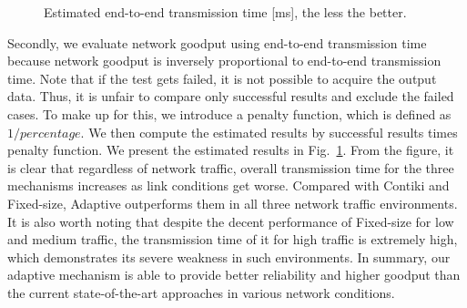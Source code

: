 \documentclass[runningheads,a4paper]{llncs}
\begin{document}
\begin{figure}
	\vspace{-10pt}
	\centering
	\caption{Estimated end-to-end transmission time [ms], the less the better.}
	\label{fig:tm}
	\vspace{-10pt}
\end{figure}
Secondly, we evaluate network goodput using end-to-end transmission time because network goodput is inversely proportional to end-to-end transmission time. Note that if the test gets failed, it is not possible to acquire the output data. Thus, it is unfair to compare only successful results and exclude the failed cases. To make up for this, we introduce a penalty function, which is defined as $1/percentage$. We then compute the estimated results by successful results times penalty function. We present the estimated results in Fig.~\ref{fig:tm}. From the figure, it is clear that regardless of network traffic, overall transmission time for the three mechanisms increases as link conditions get worse. Compared with Contiki and Fixed-size, Adaptive outperforms them in all three network traffic environments. It is also worth noting that despite the decent performance of Fixed-size for low and medium traffic, the transmission time of it for high traffic is extremely high, which demonstrates its severe weakness in such environments. In summary, our adaptive mechanism is able to provide better reliability and higher goodput than the current state-of-the-art approaches in various network conditions.
\end{document}
